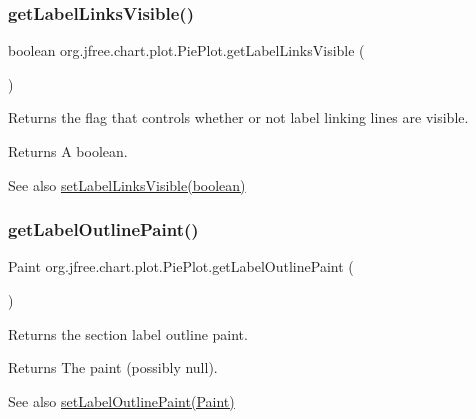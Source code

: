 \subsubsection{\texorpdfstring{get\+Label\+Links\+Visible()}{getLabelLinksVisible()}}
{\footnotesize\ttfamily boolean org.\+jfree.\+chart.\+plot.\+Pie\+Plot.\+get\+Label\+Links\+Visible (\begin{DoxyParamCaption}{ }\end{DoxyParamCaption})}

Returns the flag that controls whether or not label linking lines are visible.

\begin{DoxyReturn}{Returns}
A boolean.
\end{DoxyReturn}
\begin{DoxySeeAlso}{See also}
\mbox{\hyperlink{classorg_1_1jfree_1_1chart_1_1plot_1_1_pie_plot_aaf3586d5289e6bfd971a484dde785303}{set\+Label\+Links\+Visible(boolean)}} 
\end{DoxySeeAlso}
\mbox{\label{classorg_1_1jfree_1_1chart_1_1plot_1_1_pie_plot_ad8d6026aa75b647274e8ace856c7769a}} 
\subsubsection{\texorpdfstring{get\+Label\+Outline\+Paint()}{getLabelOutlinePaint()}}
{\footnotesize\ttfamily Paint org.\+jfree.\+chart.\+plot.\+Pie\+Plot.\+get\+Label\+Outline\+Paint (\begin{DoxyParamCaption}{ }\end{DoxyParamCaption})}

Returns the section label outline paint.

\begin{DoxyReturn}{Returns}
The paint (possibly {\ttfamily null}).
\end{DoxyReturn}
\begin{DoxySeeAlso}{See also}
\mbox{\hyperlink{classorg_1_1jfree_1_1chart_1_1plot_1_1_pie_plot_a16e60b06f3dd0138ff6a81fa8b94c30f}{set\+Label\+Outline\+Paint(\+Paint)}} 
\end{DoxySeeAlso}
\mbox{\label{classorg_1_1jfree_1_1chart_1_1plot_1_1_pie_plot_a5b02eef0fa1268e222786b17e63b4ab9}} 
